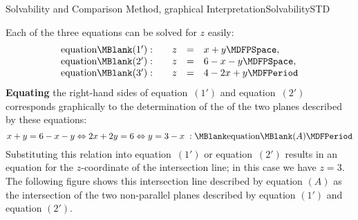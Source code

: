 \begin{MXContent}{Solvability and Comparison Method, graphical Interpretation}{Solvability}{STD}
\begin{MExample}
Each of the three equations can be solved for $z$ easily:
$$\begin{array}{lcrcl} \mbox{equation}\MBlank (1'): & & z & = & x + y \MDFPSpace,\\
\mbox{equation}\MBlank (2'): & & z & = & 6 - x - y \MDFPSpace,\\
\mbox{equation}\MBlank (3'): & & z & = & 4 - 2 x + y \MDFPeriod \end{array}$$
\textbf{Equating} the right-hand sides of equation~$(1')$ and equation~$(2')$ 
corresponds graphically to the determination of the 
 of the two planes described by these equations:
$$x + y = 6 - x - y \Leftrightarrow 2 x + 2 y = 6 \Leftrightarrow y = 3 - x \; : \MBlank\mbox{equation}\MBlank (A) \MDFPeriod $$
Substituting this relation into equation~$(1')$ or equation~$(2')$ results 
in an equation for the $z$-coordinate of the intersection line; in this case
we have $z=3$. The following figure shows this intersection line described by 
equation $(A)$ as the intersection of the two non-parallel planes described 
by equation $(1')$ and equation $(2')$.


\end{MExample}
\end{MXContent}
